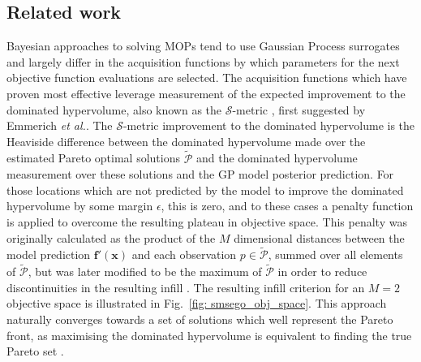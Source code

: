 \documentclass[conference]{IEEEtran}
\makeatletter
\newcommand{\nobj}{M}
\newcommand\hpv{dominated hypervolume\xspace}
\newcommand\ei{EI\xspace}
\newcommand\gp{GP\xspace}
\newcommand\Papprox{\tilde{\mathcal{P}}}
\newcommand{\bx}{\mathbf{x}}
\newcommand{\bff}{\mathbf{f}}
\newcommand*{\etal}{\textit{et al.}\@\xspace}
\makeatother
\begin{document}

\subsection{Related work}\label{section:related_work}

Bayesian approaches to solving MOPs tend to use Gaussian Process surrogates and largely differ in the acquisition functions by which parameters for the next objective function evaluations are selected. The acquisition functions which have proven most effective leverage measurement of the expected improvement to the \hpv, also known as the $\mathcal{S}$-metric  \cite{emmerich2008computation}, first suggested by Emmerich \etal \cite{emmerich2006single}.  The $\mathcal{S}$-metric improvement to the \hpv is the Heaviside difference between the \hpv  made over the estimated Pareto optimal solutions $\Papprox$ and the \hpv measurement over these solutions and the \gp model posterior prediction. For those locations which are not predicted by the model to improve the \hpv by some margin $\epsilon$, this is zero, and to these cases a penalty function is applied to overcome the resulting plateau in objective space. This penalty was originally calculated as the product of the $\nobj$ dimensional distances between the model prediction $\bff'(\bx)$ and each observation $p \in \Papprox$, summed over all elements of $\Papprox$,   but was later modified  to be the maximum of $\Papprox$ in order to reduce discontinuities in the resulting infill  \cite{wagner2010expected}. The resulting infill criterion for an $\nobj=2$ objective space is illustrated in Fig.\ \ref{fig: smsego_obj_space}. This approach naturally converges towards a set of solutions which well represent the Pareto front, as maximising the \hpv is equivalent to finding the true Pareto set \cite{fleischer2003measure}. 
\end{document}
